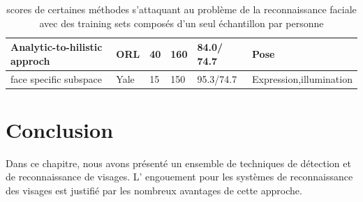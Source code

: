 \begin{table}[htbp]
\begin{tabular}{|l|p{2cm}|p{1cm}|p{1cm}|p{2cm}|p{3cm}|}
		\footnotesize Analytic-to-hilistic approch&\footnotesize ORL&40&160&\footnotesize 84.0/ 74.7&\footnotesize Pose\\ \hline
		\footnotesize face specific subspace&\footnotesize Yale&15&150&\footnotesize 95.3/74.7&\footnotesize Expression,illumination\\ 
			\hline
		\end{tabular}
	\caption[algorithmes et leurs performances sur le 'one sample problem']{scores de certaines méthodes s'attaquant au problème de la reconnaissance faciale avec des training sets composés d'un seul échantillon par personne}
	\label{tab:scoresDeCertaines}
\end{table}


\section{Conclusion} 
Dans ce chapitre, nous avons présenté un ensemble de techniques de détection et de reconnaissance de visages. L'
engouement  pour  les  systèmes  de  reconnaissance  des  visages  est  justifié  par  les  nombreux
avantages de cette approche.